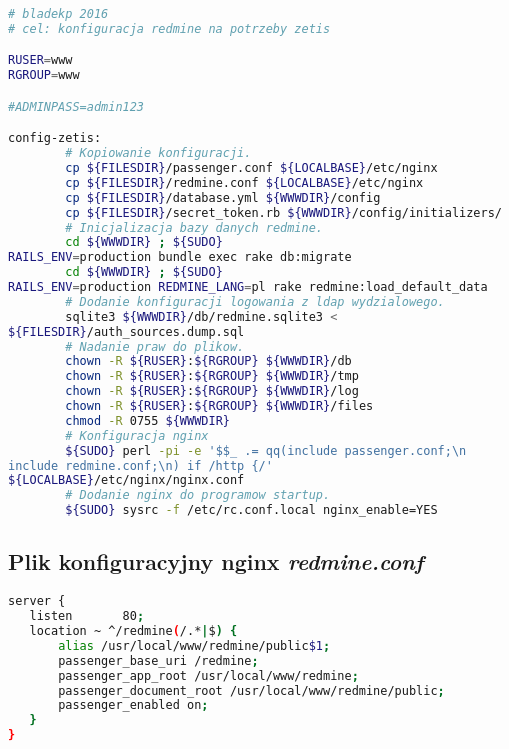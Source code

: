 \documentclass[a4paper,11pt,notitlepage]{article}
\begin{document}
\begin{lstlisting}[language=sh,frame=single]
# bladekp 2016
# cel: konfiguracja redmine na potrzeby zetis

RUSER=www
RGROUP=www

#ADMINPASS=admin123

config-zetis:
        # Kopiowanie konfiguracji.
        cp ${FILESDIR}/passenger.conf ${LOCALBASE}/etc/nginx
        cp ${FILESDIR}/redmine.conf ${LOCALBASE}/etc/nginx
        cp ${FILESDIR}/database.yml ${WWWDIR}/config
        cp ${FILESDIR}/secret_token.rb ${WWWDIR}/config/initializers/
        # Inicjalizacja bazy danych redmine.
        cd ${WWWDIR} ; ${SUDO} 
RAILS_ENV=production bundle exec rake db:migrate
        cd ${WWWDIR} ; ${SUDO} 
RAILS_ENV=production REDMINE_LANG=pl rake redmine:load_default_data
        # Dodanie konfiguracji logowania z ldap wydzialowego.
        sqlite3 ${WWWDIR}/db/redmine.sqlite3 < 
${FILESDIR}/auth_sources.dump.sql
        # Nadanie praw do plikow.
        chown -R ${RUSER}:${RGROUP} ${WWWDIR}/db
        chown -R ${RUSER}:${RGROUP} ${WWWDIR}/tmp
        chown -R ${RUSER}:${RGROUP} ${WWWDIR}/log
        chown -R ${RUSER}:${RGROUP} ${WWWDIR}/files
        chmod -R 0755 ${WWWDIR}
        # Konfiguracja nginx
        ${SUDO} perl -pi -e '$$_ .= qq(include passenger.conf;\n 
include redmine.conf;\n) if /http {/' 
${LOCALBASE}/etc/nginx/nginx.conf 
        # Dodanie nginx do programow startup.
        ${SUDO} sysrc -f /etc/rc.conf.local nginx_enable=YES
\end{lstlisting}

\subsection{Plik konfiguracyjny nginx \textit{redmine.conf}}

\begin{lstlisting}[language=sh,frame=single]
server {
   listen       80;                                             
   location ~ ^/redmine(/.*|$) {                                
       alias /usr/local/www/redmine/public$1;
       passenger_base_uri /redmine;
       passenger_app_root /usr/local/www/redmine;
       passenger_document_root /usr/local/www/redmine/public;
       passenger_enabled on;
   }
}
\end{lstlisting}
\end{document}
